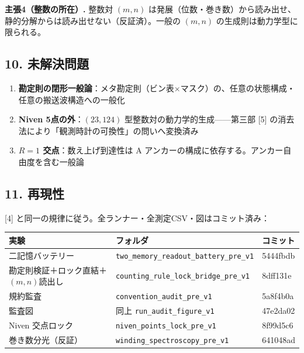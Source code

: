 \documentclass[
  a4paper,
]{ltjsarticle}
\newcounter{none} %
\providecommand{\tightlist}{%
  \setlength{\itemsep}{0pt}\setlength{\parskip}{0pt}}
\begin{document}
\textbf{主張4（整数の所在）.} 整数対 \((m,n)\)
は発展（位数・巻き数）から読み出せ、静的分解からは読み出せない（反証済）。一般の
\((m,n)\) の生成則は動力学型に限られる。

\subsection{10. 未解決問題}\label{ux672aux89e3ux6c7aux554fux984c}

\begin{enumerate}
\def\labelenumi{\arabic{enumi}.}
\tightlist
\item
  \textbf{勘定則の閉形一般論}：メタ勘定則（ビン表×マスク）の、任意の状態構成・任意の搬送波構造への一般化
\item
  \textbf{Niven 5点の外}：\((23,124)\)
  型整数対の動力学的生成------第三部 {[}5{]}
  の消去法により「観測時計の可換性」の問いへ変換済み
\item
  \textbf{\(R=1\) 交点}：数え上げ到達性は A
  アンカーの構成に依存する。アンカー自由度を含む一般論
\end{enumerate}

\subsection{11. 再現性}\label{ux518dux73feux6027}

{[}4{]} と同一の規律に従う。全ランナー・全測定CSV・図はコミット済み：

{\def\LTcaptype{none} %
\begin{longtable}[]{@{}
  >{\raggedright\arraybackslash}p{}
  >{\raggedright\arraybackslash}p{}
  >{\raggedright\arraybackslash}p{}@{}}
\toprule\noalign{}
\begin{minipage}[b]{\linewidth}\raggedright
実験
\end{minipage} & \begin{minipage}[b]{\linewidth}\raggedright
フォルダ
\end{minipage} & \begin{minipage}[b]{\linewidth}\raggedright
コミット
\end{minipage} \\
\midrule\noalign{}
\endhead
\bottomrule\noalign{}
\endlastfoot
二記憶バッテリー & \texttt{two\_memory\_readout\_battery\_pre\_v1} &
5444fbdb \\
勘定則検証＋ロック直結＋\((m,n)\)読出し &
\texttt{counting\_rule\_lock\_bridge\_pre\_v1} & 8dff131e \\
規約監査 & \texttt{convention\_audit\_pre\_v1} & 5a8f4b0a \\
監査図 & 同上 \texttt{run\_audit\_figure\_v1} & 47e2da02 \\
Niven 交点ロック & \texttt{niven\_points\_lock\_pre\_v1} & 8f99d5c6 \\
巻き数分光（反証） & \texttt{winding\_spectroscopy\_pre\_v1} &
641048ad \\
\end{longtable}
}
\end{document}
